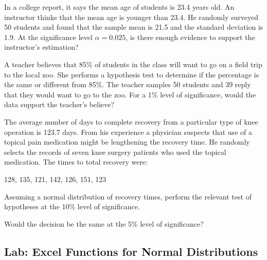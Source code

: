 \begin{exercise}

In a college report, it says the mean age of students is 23.4 years old.
An instructor thinks that the mean age is younger than 23.4. He randomly
surveyed 50 students and found that the sample mean is 21.5 and the
standard deviation is 1.9. At the significance level \(\alpha=0.025\),
is there enough evidence to support the instructor's estimation?

\end{exercise}
\vspace*{8\baselineskip}

\begin{exercise}

A teacher believes that 85\% of students in the class will want to go on
a field trip to the local zoo. She performs a hypothesis test to
determine if the percentage is the same or different from 85\%. The
teacher samples 50 students and 39 reply that they would want to go to
the zoo. For a 1\% level of significance, would the data support the
teacher's believe?

\end{exercise}
\vspace*{8\baselineskip}

\begin{exercise}

  The average number of days to complete recovery from a particular type
  of knee operation is 123.7 days. From his experience a physician
  suspects that use of a topical pain medication might be lengthening the
  recovery time. He randomly selects the records of seven knee surgery
  patients who used the topical medication. The times to total recovery
  were:
  
  128, 135, 121, 142, 126, 151, 123
  
  Assuming a normal distribution of recovery times, perform the relevant
  test of hypotheses at the 10\% level of significance.
  
  Would the decision be the same at the 5\% level of significance?
  
  \end{exercise}
  \vspace*{8\baselineskip}

\hypertarget{lab-excel-functions-for-normal-distributions}{%
\subsection{Lab: Excel Functions for Normal
Distributions}\label{lab-excel-functions-for-normal-distributions}}

